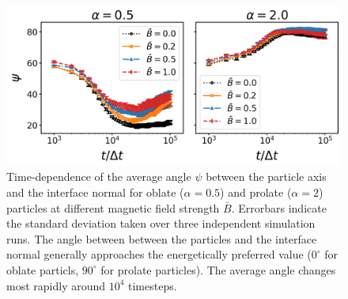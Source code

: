 \begin{figure}
\centering
\includegraphics[scale = 0.4]{figures/results/paper1/psi-vs-t.png}
\caption{Time-dependence of the average angle $\psi$ between the particle axis and the 
        interface normal for oblate ($\alpha=0.5$) and prolate ($\alpha=2$) particles at different 
        magnetic field strength $\bar{B}$. Errorbars indicate the standard deviation taken over three 
        independent simulation runs. The angle between between the particles and the interface normal generally 
        approaches the energetically preferred value ($0^\circ$ for oblate particls, $90^\circ$ for prolate particles).
        The average angle changes most rapidly around $10^4$ timesteps.}
\label{fig:psi_time}
\end{figure}

